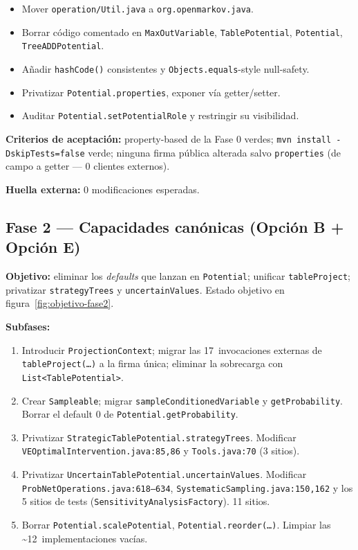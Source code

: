 \documentclass[11pt,a4paper]{article}
\newcommand{\code}[1]{\texttt{#1}}
\begin{document}
\begin{itemize}[leftmargin=*]
  \item Mover \code{operation/Util.java} a \code{org.openmarkov.java}.
  \item Borrar código comentado en \code{MaxOutVariable},
        \code{TablePotential}, \code{Potential},
        \code{TreeADDPotential}.
  \item Añadir \code{hashCode()} consistentes y \code{Objects.equals}-style
        null-safety.
  \item Privatizar \code{Potential.properties}, exponer vía getter/setter.
  \item Auditar \code{Potential.setPotentialRole} y restringir su visibilidad.
\end{itemize}

\textbf{Criterios de aceptación:} property-based de la Fase 0 verdes;
\code{mvn install -DskipTests=false} verde; ninguna firma pública alterada
salvo \code{properties} (de campo a getter --- 0 clientes externos).

\textbf{Huella externa:} 0 modificaciones esperadas.

\subsection{Fase 2 --- Capacidades canónicas (Opción B + Opción E)}

\textbf{Objetivo:} eliminar los \emph{defaults} que lanzan en
\code{Potential}; unificar \code{tableProject}; privatizar \code{strategyTrees}
y \code{uncertainValues}. Estado objetivo en
figura~\ref{fig:objetivo-fase2}.

\textbf{Subfases:}

\begin{enumerate}[leftmargin=*]
  \item[\textbf{2a}] Introducir \code{ProjectionContext}; migrar las
        17~invocaciones externas de \code{tableProject(\dots)} a la firma
        única; eliminar la sobrecarga con \code{List<TablePotential>}.
  \item[\textbf{2b}] Crear \code{Sampleable}; migrar \code{sampleConditionedVariable}
        y \code{getProbability}. Borrar el default 0 de \code{Potential.getProbability}.
  \item[\textbf{2c}] Privatizar \code{StrategicTablePotential.strategyTrees}.
        Modificar \code{VEOptimalIntervention.java:85,86} y
        \code{Tools.java:70} (3 sitios).
  \item[\textbf{2d}] Privatizar \code{UncertainTablePotential.uncertainValues}.
        Modificar \code{ProbNetOperations.java:618--634},
        \code{SystematicSampling.java:150,162} y los 5 sitios de tests
        (\code{SensitivityAnalysisFactory}). 11 sitios.
  \item[\textbf{2e}] Borrar \code{Potential.scalePotential},
        \code{Potential.reorder(\dots)}. Limpiar las
        \textasciitilde 12~implementaciones vacías.
\end{enumerate}
\end{document}
